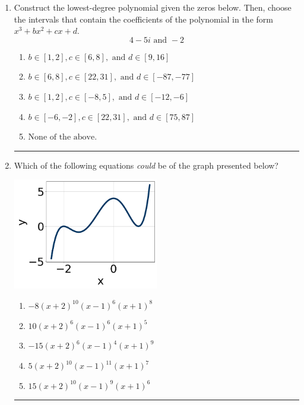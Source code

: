 \documentclass[14pt]{extbook}
\newcommand{\litem}[1]{\item#1\hspace*{-1cm}\rule{\textwidth}{0.4pt}}
\begin{document}
\begin{enumerate}
{\begin{enumerate}[label=\Alph*.]
\end{enumerate} }
\litem{
Construct the lowest-degree polynomial given the zeros below. Then, choose the intervals that contain the coefficients of the polynomial in the form $x^3+bx^2+cx+d$.\[ 4 - 5 i \text{ and } -2 \]\begin{enumerate}[label=\Alph*.]
\item \( b \in [1, 2], c \in [6, 8], \text{ and } d \in [9, 16] \)
\item \( b \in [6, 8], c \in [22, 31], \text{ and } d \in [-87, -77] \)
\item \( b \in [1, 2], c \in [-8, 5], \text{ and } d \in [-12, -6] \)
\item \( b \in [-6, -2], c \in [22, 31], \text{ and } d \in [75, 87] \)
\item \( \text{None of the above.} \)

\end{enumerate} }
\litem{
Which of the following equations \textit{could} be of the graph presented below?
\begin{center}
    \includegraphics[width=0.5\textwidth]{../Figures/polyGraphToFunctionCopyB.png}
\end{center}
\begin{enumerate}[label=\Alph*.]
\item \( -8(x + 2)^{10} (x - 1)^{6} (x + 1)^{8} \)
\item \( 10(x + 2)^{6} (x - 1)^{6} (x + 1)^{5} \)
\item \( -15(x + 2)^{6} (x - 1)^{4} (x + 1)^{9} \)
\item \( 5(x + 2)^{10} (x - 1)^{11} (x + 1)^{7} \)
\item \( 15(x + 2)^{10} (x - 1)^{9} (x + 1)^{6} \)


\end{enumerate}}
\end{enumerate}
\end{document}
